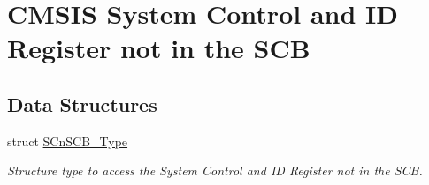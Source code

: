 \hypertarget{group___c_m_s_i_s___s_cn_s_c_b}{\section{C\-M\-S\-I\-S System Control and I\-D Register not in the S\-C\-B}
\label{group___c_m_s_i_s___s_cn_s_c_b}
}
\subsection*{Data Structures}
\begin{DoxyCompactItemize}
\item 
struct \hyperlink{struct_s_cn_s_c_b___type}{S\-Cn\-S\-C\-B\-\_\-\-Type}
\begin{DoxyCompactList}\small\item\em Structure type to access the System Control and I\-D Register not in the S\-C\-B. \end{DoxyCompactList}\end{DoxyCompactItemize}

